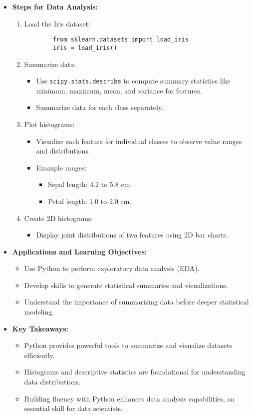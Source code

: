 \documentclass{article}
\begin{document}
\begin{itemize}
  \item \textbf{Steps for Data Analysis:}
    \begin{enumerate}
      \item Load the Iris dataset:
        \begin{verbatim}
        from sklearn.datasets import load_iris
        iris = load_iris()
        \end{verbatim}
      \item Summarize data:
        \begin{itemize}
          \item Use \texttt{scipy.stats.describe} to compute summary statistics like minimum, maximum, mean, and variance for features.
          \item Summarize data for each class separately.
        \end{itemize}
      \item Plot histograms:
        \begin{itemize}
          \item Visualize each feature for individual classes to observe value ranges and distributions.
          \item Example ranges:
            \begin{itemize}
              \item Sepal length: 4.2 to 5.8 cm.
              \item Petal length: 1.0 to 2.0 cm.
            \end{itemize}
        \end{itemize}
      \item Create 2D histograms:
        \begin{itemize}
          \item Display joint distributions of two features using 2D bar charts.
        \end{itemize}
    \end{enumerate}

  \item \textbf{Applications and Learning Objectives:}
    \begin{itemize}
      \item Use Python to perform exploratory data analysis (EDA).
      \item Develop skills to generate statistical summaries and visualizations.
      \item Understand the importance of summarizing data before deeper statistical modeling.
    \end{itemize}

  \item \textbf{Key Takeaways:}
    \begin{itemize}
      \item Python provides powerful tools to summarize and visualize datasets efficiently.
      \item Histograms and descriptive statistics are foundational for understanding data distributions.
      \item Building fluency with Python enhances data analysis capabilities, an essential skill for data scientists.
    \end{itemize}
\end{itemize}
\end{document}
